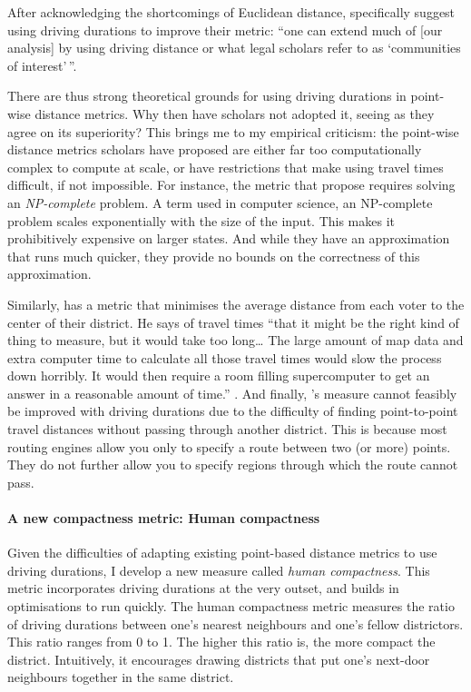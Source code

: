 \documentclass[]{article}
\let\oldparagraph\paragraph
\renewcommand{\paragraph}[1]{\oldparagraph{#1}\mbox{}}
\begin{document}
After acknowledging the shortcomings of Euclidean distance,
\citeauthor{fh2011} specifically suggest using driving durations to
improve their metric: ``one can extend much of {[}our analysis{]} by
using driving distance or what legal scholars refer to as `communities
of interest'\,''.

There are thus strong theoretical grounds for using driving durations in
point-wise distance metrics. Why then have scholars not adopted it,
seeing as they agree on its superiority? This brings me to my empirical
criticism: the point-wise distance metrics scholars have proposed are
either far too computationally complex to compute at scale, or have
restrictions that make using travel times difficult, if not impossible.
For instance, the metric that \citet{fh2011} propose requires solving an
\emph{NP-complete} problem. A term used in computer science, an
NP-complete problem scales exponentially with the size of the input.
This makes it prohibitively expensive on larger states. And while they
have an approximation that runs much quicker, they provide no bounds on
the correctness of this approximation.

Similarly, \citeauthor{olson2010} has a metric that minimises the
average distance from each voter to the center of their district. He
says of travel times ``that it might be the right kind of thing to
measure, but it would take too long\ldots{} The large amount of map data
and extra computer time to calculate all those travel times would slow
the process down horribly. It would then require a room filling
supercomputer to get an answer in a reasonable amount of time.''
\citep{olson2010}. And finally, \citeauthor{cm2010}'s measure cannot
feasibly be improved with driving durations due to the difficulty of
finding point-to-point travel distances without passing through another
district. This is because most routing engines allow you only to specify
a route between two (or more) points. They do not further allow you to
specify regions through which the route cannot pass.

\hypertarget{a-new-compactness-metric-human-compactness}{%
\paragraph{A new compactness metric: Human
compactness}\label{a-new-compactness-metric-human-compactness}}

Given the difficulties of adapting existing point-based distance metrics
to use driving durations, I develop a new measure called \emph{human
compactness}. This metric incorporates driving durations at the very
outset, and builds in optimisations to run quickly. The human
compactness metric measures the ratio of driving durations between one's
nearest neighbours and one's fellow districtors. This ratio ranges from
0 to 1. The higher this ratio is, the more compact the district.
Intuitively, it encourages drawing districts that put one's next-door
neighbours together in the same district.
\end{document}
